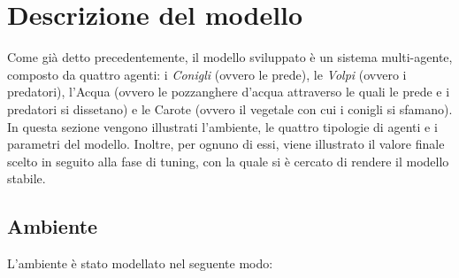 \documentclass[11pt]{article}
\begin{document}
\section{Descrizione del modello}
Come già detto precedentemente, il modello sviluppato è un sistema multi-agente, composto da quattro agenti: i \emph{Conigli} (ovvero le prede), le \emph{Volpi} (ovvero i predatori), l'Acqua (ovvero le pozzanghere d'acqua attraverso le quali le prede e i predatori si dissetano) e le Carote (ovvero il vegetale con cui i conigli si sfamano). In questa sezione vengono illustrati l'ambiente, le quattro tipologie di agenti e i parametri del modello. Inoltre, per ognuno di essi, viene illustrato il valore finale scelto in seguito alla fase di tuning, con la quale si è cercato di rendere il modello stabile. 

\subsection{Ambiente}
L'ambiente è stato modellato nel seguente modo:
\end{document}
